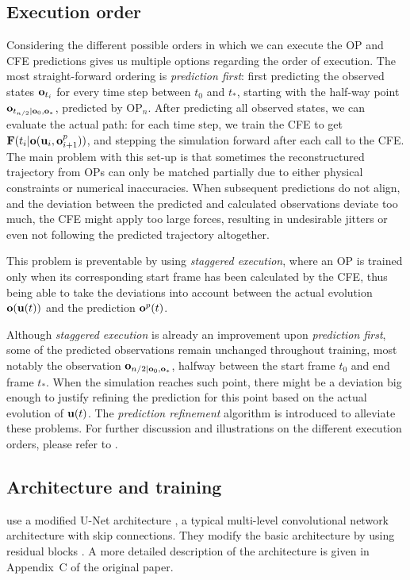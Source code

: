 \documentclass[acmtog]{techreportacmart}
\begin{document}
\subsection{Execution order} 
Considering the different possible orders in which we can execute the OP and CFE
predictions gives us multiple options regarding the order of execution. The most
straight-forward ordering is \textit{prediction first}: first predicting the
observed states $\vb{o}_{t_i}$ for every time step between $t_0$ and $t_*$, starting
with the half-way point $\vb{o}_{t_{n/2} | \vb{o}_0, \vb{o}_*}$, predicted by OP$_n$.
After predicting all observed states, we can evaluate the actual path: for each
time step, we train the CFE to get $\vb{F}(t_i|\vb{o}(\vb{u}_i,
\vb{o}_{i+1}^p))$, and stepping the simulation forward after each call to the
CFE. The main problem with this set-up is that sometimes the reconstructured
trajectory from OPs can only be matched partially due to either physical
constraints or numerical inaccuracies. When subsequent predictions do not align,
and the deviation between the predicted and calculated observations deviate too
much, the CFE might apply too large forces, resulting in undesirable jitters or
even not following the predicted trajectory altogether.

This problem is preventable by using \textit{staggered execution}, where an OP
is trained only when its corresponding start frame has been calculated by the
CFE, thus being able to take the deviations into account between the actual
evolution $\vb{o}(\vb{u}(t))$ and the prediction $\vb{o}^p(t)$.

Although \textit{staggered execution} is already an improvement upon
\textit{prediction first}, some of the predicted observations remain unchanged
throughout training, most notably the observation 
$\vb{o}_{n/2 | \vb{o}_0, \vb{o}_*}$, halfway between the start frame $t_0$ and
end frame $t_*$. When the simulation reaches such point, there might be
a deviation big enough to justify refining the prediction for this point based
on the actual evolution of $\vb{u}(t)$.  The
\textit{prediction refinement} algorithm is introduced to alleviate these
problems. For further discussion and illustrations on the different execution
orders, please refer to \cite{ControlPDEs}.

\subsection{Architecture and training}
\cite{ControlPDEs} use a modified U-Net architecture \cite{unet}, a typical
multi-level convolutional network architecture with skip connections. They
modify the basic architecture by using residual blocks \cite{residual-blocks}.
A more detailed description of the architecture is given in Appendix~C of the
original paper.
\end{document}
